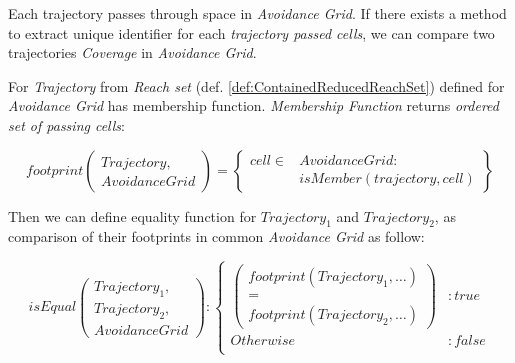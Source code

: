 Each trajectory passes through space in \emph{Avoidance Grid}. If there exists a method to extract unique identifier for each \emph{trajectory passed cells}, we can compare two trajectories \emph{Coverage} in \emph{Avoidance Grid}.


\begin{definition} \label{def:trajectoryFootprint}
    For \emph{Trajectory} from \emph{Reach set} (def. \ref{def:ContainedReducedReachSet}) defined for \emph{Avoidance Grid} has membership function. \emph{Membership Function} returns \emph{ordered set of passing cells}:
    
    \begin{equation}\label{eq:setOfPassedCells}
        footprint
        \left(\begin{gathered}
            Trajectory,\\
            AvoidanceGrid    
        \end{gathered}\right) 
        = 
        \left\{
            \begin{aligned}
                cell \in& AvoidanceGrid:\\ &isMember(trajectory,cell)
            \end{aligned}
        \right\}
    \end{equation}
    
    \noindent Then we can define equality function for $Trajectory_1$ and $Trajectory_2$, as comparison of their footprints in common \emph{Avoidance Grid} as follow:
    
    \begin{equation}\label{eq:TrajectoryEquality}
        isEqual\left(\begin{gathered}
        Trajectory_1,\\Trajectory_2,\\AvoidanceGrid  
        \end{gathered}\right):
        \begin{cases}
            \left(\begin{gathered}
                footprint(Trajectory_1,\dots)\\
                = \\
                footprint(Trajectory_2,\dots)
            \end{gathered}\right)
            &:true\\
            Otherwise&: false\\
        \end{cases}
    \end{equation}
\end{definition}

